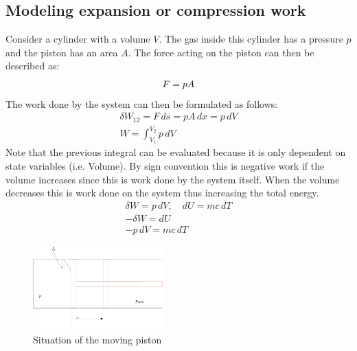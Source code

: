 \documentclass[11pt, a4paper]{article}
\begin{document}
\subsection{Modeling expansion or compression work}
Consider a cylinder with a volume $V$. The gas inside this cylinder has a pressure $p$ and the piston has an area $A$. The force acting on the piston can then be described as:
\begin{equation}
  F = pA\\
\end{equation}
The work done by the system can then be formulated as follows:
\begin{gather}
  \delta W_{12} = F\,ds = pA\,dx = p\,dV\\
  W = \int_{V_1}^{V_2} p\,dV
\end{gather}
Note that the previous integral can be evaluated because it is only dependent on state variables (i.e. Volume). By sign convention this is negative work if the volume increases since this is work done by the system itself. When the volume decreases this is work done on the system thus increasing the total energy. 
\begin{gather}
  \delta W = p\,dV, \quad dU = mc\,dT\\
  -\delta W = dU\\
  -p\,dV = mc\,dT
\end{gather}
\begin{figure}[h!]
  \centerline{\includegraphics[width=50mm]{images/Work Done.png}}
  \caption{Situation of the moving piston}
\end{figure}
\end{document}
